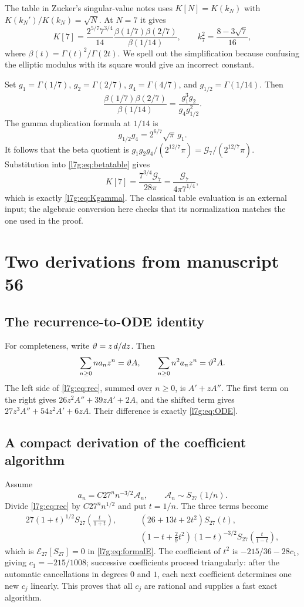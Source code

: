 \documentclass[11pt,letterpaper]{article}
\theoremstyle{remark}\newtheorem{remark}[theorem]{Remark}
\newcommand{\G}{\mathcal G_7}\newcommand{\Ast}{A_\star}
\newcounter{l7gtrsavedeq}
\begin{document}
The table in Zucker's singular-value notes \cite[Table~1]{l7g:beta} uses
$K[N]=K(k_N)$ with $K(k_N')/K(k_N)=\sqrt N$. At $N=7$ it gives
\begin{equation}\label{l7g:eq:betatable}
 K[7]=\frac{2^{5/7}7^{3/4}}{14}
 \frac{\beta(1/7)\beta(2/7)}{\beta(1/14)},\qquad
 k_7^2=\frac{8-3\sqrt7}{16},
\end{equation}
where $\beta(t)=\Gamma(t)^2/\Gamma(2t)$. We spell out the simplification
because confusing the elliptic modulus with its square would give an
incorrect constant.

Set $g_1=\Gamma(1/7)$, $g_2=\Gamma(2/7)$, $g_4=\Gamma(4/7)$, and
$g_{1/2}=\Gamma(1/14)$. Then
\[
 \frac{\beta(1/7)\beta(2/7)}{\beta(1/14)}
 =\frac{g_1^3g_2}{g_4g_{1/2}^2}.
\]
The gamma duplication formula at $1/14$ is
\[
 g_{1/2}g_4=2^{6/7}\sqrt\pi\,g_1.
\]
It follows that the beta quotient is
$g_1g_2g_4/(2^{12/7}\pi)=\G/(2^{12/7}\pi)$. Substitution into
\eqref{l7g:eq:betatable} gives
\[
 K[7]=\frac{7^{3/4}\G}{28\pi}
      =\frac{\G}{4\pi7^{1/4}},
\]
which is exactly \eqref{l7g:eq:Kgamma}. The classical table evaluation is
an external input; the algebraic conversion here checks that its
normalization matches the one used in the proof.

\section{Two derivations from manuscript 56}\label{l7g:app:derivations}

\subsection{The recurrence-to-ODE identity}
For completeness, write $\vartheta=z\,d/dz$. Then
\[
 \sum_{n\ge0}n a_nz^n=\vartheta A,
 \qquad
 \sum_{n\ge0}n^2a_nz^n=\vartheta^2A.
\]
The left side of \eqref{l7g:eq:rec}, summed over $n\ge0$, is
$A'+zA''$. The first term on the right gives
$26z^2A''+39zA'+2A$, and the shifted term gives
$27z^3A''+54z^2A'+6zA$. Their difference is exactly
\eqref{l7g:eq:ODE}.

\subsection{A compact derivation of the coefficient algorithm}
Assume
\[
 a_n=C27^nn^{-3/2}\mathcal A_n,
 \qquad
 \mathcal A_n\sim S_{27}(1/n).
\]
Divide \eqref{l7g:eq:rec} by $C27^nn^{1/2}$ and put $t=1/n$.
The three terms become
\begin{align*}
 27(1+t)^{1/2}S_{27}\!\left(\frac{t}{1+t}\right),\qquad
 &(26+13t+2t^2)S_{27}(t),\\
 &\left(1-t+\frac29t^2\right)(1-t)^{-3/2}
 S_{27}\!\left(\frac{t}{1-t}\right),
\end{align*}
which is $\mathcal E_{27}[S_{27}]=0$ in \eqref{l7g:eq:formalE}. The
coefficient of $t^2$ is $-215/36-28c_1$, giving $c_1=-215/1008$;
successive coefficients proceed triangularly: after the automatic
cancellations in degrees $0$ and $1$, each next coefficient determines one
new $c_j$ linearly. This proves that all $c_j$ are rational and supplies a
fast exact algorithm.
\end{document}
